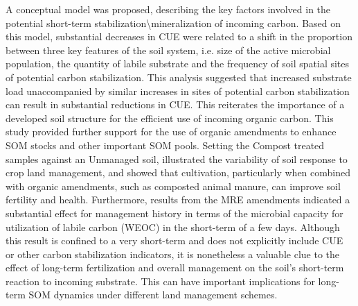 	A conceptual model was proposed, describing the key factors involved in the potential short-term stabilization\textbackslash mineralization of incoming carbon. Based on this model, substantial decreases in CUE were related to a shift in the proportion between three key features of the soil system, i.e. size of the active microbial population, the quantity of labile substrate and the frequency of soil spatial sites of potential carbon stabilization. This analysis suggested that increased substrate load unaccompanied by similar increases in sites of potential carbon stabilization can result in substantial reductions in CUE. This reiterates the importance of a developed soil structure for the efficient use of incoming organic carbon. This study provided further support for the use of organic amendments to enhance SOM stocks and other important SOM pools. Setting the Compost treated samples against an Unmanaged soil, illustrated the variability of soil response to crop land management, and showed that cultivation, particularly when combined with organic amendments, such as composted animal manure, can improve soil fertility and health. Furthermore, results from the MRE amendments indicated a substantial effect for management history in terms of the microbial capacity for utilization of labile carbon (WEOC) in the short-term of a few days. Although this result is confined to a very short-term and does not explicitly include CUE or other carbon stabilization indicators, it is nonetheless a valuable clue to the effect of long-term fertilization and overall management on the soil's short-term reaction to incoming substrate. This can have important implications for long-term SOM dynamics under different land management schemes.  
	         
	
	
     